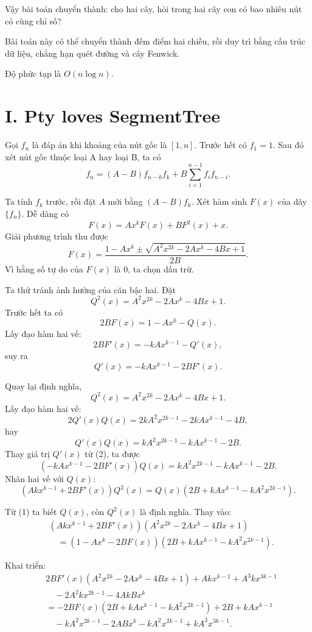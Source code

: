 \documentclass[11pt]{article}
\begin{document}
Vậy bài toán chuyển thành: cho hai cây, hỏi trong hai cây con có bao nhiêu
nút có cùng chỉ số?

Bài toán này có thể chuyển thành đếm điểm hai chiều, rồi duy trì bằng cấu
trúc dữ liệu, chẳng hạn quét đường và cây Fenwick.

Độ phức tạp là $O(n\log n)$.

\section{I. Pty loves SegmentTree}

Gọi $f_n$ là đáp án khi khoảng của nút gốc là $[1,n]$. Trước hết có
$f_1=1$. Sau đó xét nút gốc thuộc loại A hay loại B, ta có
\[
  f_n=(A-B)f_{n-k}f_k+B\sum_{i=1}^{n-1} f_i f_{n-i}.
\]

Ta tính $f_k$ trước, rồi đặt $A$ mới bằng $(A-B)f_k$. Xét hàm sinh $F(x)$
của dãy $\{f_n\}$. Dễ dàng có
\[
  F(x)=Ax^kF(x)+BF^2(x)+x.
\]
Giải phương trình thu được
\[
  F(x)=\frac{1-Ax^k\pm\sqrt{A^2x^{2k}-2Ax^k-4Bx+1}}{2B}.
\]
Vì hằng số tự do của $F(x)$ là $0$, ta chọn dấu trừ.

Ta thử tránh ảnh hưởng của căn bậc hai. Đặt
\[
  Q^2(x)=A^2x^{2k}-2Ax^k-4Bx+1.
\]
Trước hết ta có
\[
  2BF(x)=1-Ax^k-Q(x). \tag{1}
\]
Lấy đạo hàm hai vế:
\[
  2BF'(x)=-kAx^{k-1}-Q'(x),
\]
suy ra
\[
  Q'(x)=-kAx^{k-1}-2BF'(x). \tag{2}
\]

Quay lại định nghĩa,
\[
  Q^2(x)=A^2x^{2k}-2Ax^k-4Bx+1.
\]
Lấy đạo hàm hai vế:
\[
  2Q'(x)Q(x)=2kA^2x^{2k-1}-2kAx^{k-1}-4B,
\]
hay
\[
  Q'(x)Q(x)=kA^2x^{2k-1}-kAx^{k-1}-2B.
\]
Thay giá trị $Q'(x)$ từ (2), ta được
\[
  (-kAx^{k-1}-2BF'(x))Q(x)
  =
  kA^2x^{2k-1}-kAx^{k-1}-2B.
\]
Nhân hai vế với $Q(x)$:
\[
  (Akx^{k-1}+2BF'(x))Q^2(x)
  =
  Q(x)(2B+kAx^{k-1}-kA^2x^{2k-1}).
\]

Từ (1) ta biết $Q(x)$, còn $Q^2(x)$ là định nghĩa. Thay vào:
\[
\begin{aligned}
 &(Akx^{k-1}+2BF'(x))(A^2x^{2k}-2Ax^k-4Bx+1)\\
 &\quad =(1-Ax^k-2BF(x))(2B+kAx^{k-1}-kA^2x^{2k-1}).
\end{aligned}
\]

Khai triển:
\[
\begin{aligned}
&2BF'(x)(A^2x^{2k}-2Ax^k-4Bx+1)
  +Akx^{k-1}+A^3kx^{3k-1}\\
&\quad -2A^2kx^{2k-1}-4AkBx^k\\
&=
-2BF(x)(2B+kAx^{k-1}-kA^2x^{2k-1})
  +2B+kAx^{k-1}\\
&\quad -kA^2x^{2k-1}-2ABx^k-kA^2x^{2k-1}+kA^3x^{3k-1}.
\end{aligned}
\]
\end{document}
